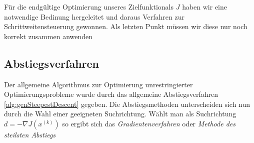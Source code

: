 Für die endgültige Optimierung unseres Zielfunktionals $J$ haben wir eine notwendige Bedinung hergeleitet und daraus Verfahren zur Schrittweitensteuerung gewonnen. Als letzten Punkt müssen wir diese nur noch korrekt zusammen anwenden
\subsection{Abstiegsverfahren}
Der allgemeine Algorithmus zur Optimierung unrestringierter Optimierungsprobleme wurde durch das allgemeine Abstiegsverfahren  \ref{alg:genSteepestDescent} gegeben. Die Abstiegsmethoden unterscheiden sich nun durch die Wahl einer geeigneten Suchrichtung. 
Wählt man als Suchrichtung $d = -\nabla J(x^{(k)})$ so ergibt sich das \textit{Gradientenverfahren} oder \textit{Methode des steilsten Abstiegs}

